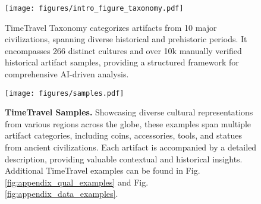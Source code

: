 \documentclass[11pt]{article}
\begin{document}
\begin{figure}[t!]
    \centering
    \texttt{[image: figures/intro\_figure\_taxonomy.pdf]}
    \caption{TimeTravel Taxonomy categorizes artifacts from 10 major civilizations, spanning diverse historical and prehistoric periods. It encompasses 266 distinct cultures and over 10k manually verified historical artifact samples, providing a structured framework for comprehensive AI-driven analysis.}
    \label{fig:taxonomy}
    \vspace{-1.5em}
\end{figure}

\begin{figure*}[t!]
\centering  
\texttt{[image: figures/samples.pdf]}
\vspace{-2em}
  \caption{
    \textbf{TimeTravel Samples.} Showcasing diverse cultural representations from various regions across the globe, these examples span multiple artifact categories, including coins, accessories, tools, and statues from ancient civilizations. Each artifact is accompanied by a detailed description, providing valuable contextual and historical insights. Additional TimeTravel examples can be found in Fig.\ref{fig:appendix_qual_examples} and Fig.\ref{fig:appendix_data_examples}.
  }
  \label{fig:samples_fig}
  \vspace{-1em}
\end{figure*}
\end{document}
